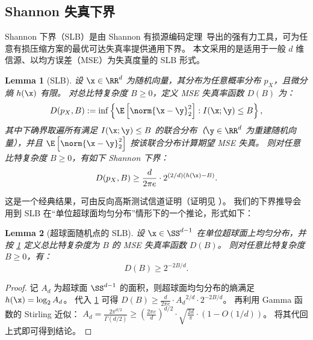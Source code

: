 \documentclass[11pt]{ctexart}
\newtheorem{lemma}{Lemma}
\let\cref\ref
\begin{document}
\subsection{Shannon 失真下界}
\label{sec:slb}
Shannon 下界（SLB）是由 Shannon 有损源编码定理~\cite{shannon1959coding}导出的强有力工具，可为任意有损压缩方案的最优可达失真率提供通用下界。
本文采用的是适用于一般 $d$ 维信源、以均方误差（MSE）为失真度量的 SLB 形式。
\begin{lemma}[SLB]\label{lem_slb}
    设 $\x \in \RR^d$ 为随机向量，其分布为任意概率分布 $p_X$，且微分熵 $h(\x)$ 有限。
    对总比特复杂度 $B\ge 0$，定义 MSE 失真率函数 $D(B)$ 为：
    \[
    D(p_X, B) := \inf \left\{ \E \left[ \norm{\x - \y}_2^2 \right] : I(\x; \y) \le B \right\},
    \]
    其中下确界取遍所有满足 $I(\x;\y)\le B$ 的联合分布（$\y\in\RR^d$ 为重建随机向量），并且 $\E \left[ \norm{\x - \y}_2^2 \right]$ 按该联合分布计算期望 MSE 失真。
    则对任意比特复杂度 $B\ge 0$，有如下 Shannon 下界：
    \[
    D(p_X, B) \ge \frac{d}{2 \pi e} \cdot 2^{(2/d) (h(\x) - B)}.
    \]
\end{lemma}
这是一个经典结果，可由反向高斯测试信道证明（证明见 \cite{cover1999elements}）。
我们的下界推导会用到 SLB 在“单位超球面均匀分布”情形下的一个推论，形式如下：
\begin{lemma}[超球面随机点的 SLB]\label{lem_slb_random_sphere}
设 $\x \in \SS^{d-1}$ 在单位超球面上均匀分布，并按 \cref{lem_slb} 定义总比特复杂度为 $B$ 的 MSE 失真率函数 $D(B)$。
则对任意比特复杂度 $B \ge 0$，有：
\[
D(B) \ge 2^{-2B/d}.
\]
\end{lemma}
\begin{proof}
记 $A_d$ 为超球面 $\SS^{d-1}$ 的面积，则超球面均匀分布的熵满足 $h(\x)=\log_2 A_d$。
代入 \cref{lem_slb} 可得
$D(B) \ge \frac{d}{2 \pi e} \cdot {A_d}^{2/d} \cdot 2^{-2B/d}$。
再利用 Gamma 函数的 Stirling 近似：
$A_d = \frac{2 \pi^{d/2}}{\Gamma(d/2)} \ge \left(\frac{2 \pi e}{d} \right)^{d/2} \cdot \sqrt{\frac{2d}{\pi}} \cdot (1 - O(1/d))$。
将其代回上式即可得到结论。
\end{proof}

\end{document}
